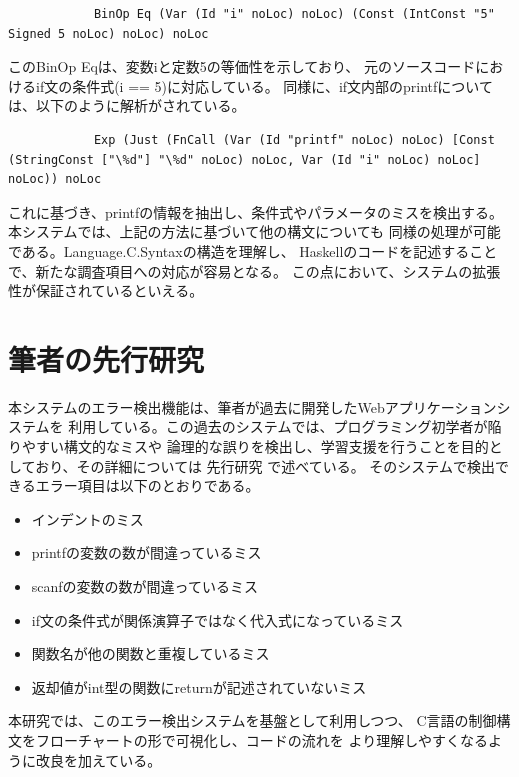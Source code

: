 \documentclass{cssspaper}
\begin{document}
        \begin{lstlisting}
            BinOp Eq (Var (Id "i" noLoc) noLoc) (Const (IntConst "5" Signed 5 noLoc) noLoc) noLoc
        \end{lstlisting}

        このBinOp Eqは、変数iと定数5の等価性を示しており、
        元のソースコードにおけるif文の条件式(i == 5)に対応している。
        同様に、if文内部のprintfについては、以下のように解析がされている。
        \begin{lstlisting}
            Exp (Just (FnCall (Var (Id "printf" noLoc) noLoc) [Const (StringConst ["\%d"] "\%d" noLoc) noLoc, Var (Id "i" noLoc) noLoc] noLoc)) noLoc
        \end{lstlisting}
        これに基づき、printfの情報を抽出し、条件式やパラメータのミスを検出する。
        本システムでは、上記の方法に基づいて他の構文についても
        同様の処理が可能である。Language.C.Syntaxの構造を理解し、
        Haskellのコードを記述することで、新たな調査項目への対応が容易となる。
        この点において、システムの拡張性が保証されているといえる。


        \section{筆者の先行研究}
        本システムのエラー検出機能は、筆者が過去に開発したWebアプリケーションシステムを
        利用している。この過去のシステムでは、プログラミング初学者が陥りやすい構文的なミスや
        論理的な誤りを検出し、学習支援を行うことを目的としており、その詳細については
        先行研究 \cite{6}で述べている。
        そのシステムで検出できるエラー項目は以下のとおりである。
        \begin{itemize}
            \item インデントのミス
            \item printfの変数の数が間違っているミス
            \item scanfの変数の数が間違っているミス
            \item if文の条件式が関係演算子ではなく代入式になっているミス
            \item 関数名が他の関数と重複しているミス
            \item 返却値がint型の関数にreturnが記述されていないミス
        \end{itemize}
        本研究では、このエラー検出システムを基盤として利用しつつ、
        C言語の制御構文をフローチャートの形で可視化し、コードの流れを
        より理解しやすくなるように改良を加えている。
\end{document}
